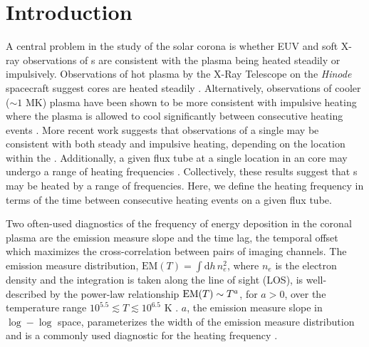 \section{Introduction}\label{sec:introduction}

A central problem in the study of the solar corona is whether EUV and soft X-ray observations of \AR s are consistent with the plasma being heated steadily or impulsively.
Observations of hot plasma by the X-Ray Telescope \citep[XRT,][]{golub_x-ray_2007} on the \textit{Hinode} spacecraft \citep{kosugi_hinode_2007} suggest \AR{} cores are heated steadily \citep[e.g.][]{warren_constraints_2011,winebarger_using_2011}.
Alternatively, observations of cooler ($\sim1$ MK) plasma have been shown to be more consistent with impulsive heating where the plasma is allowed to cool significantly between consecutive heating events \citep[e.g][]{winebarger_evolving_2003,mulu-moore_determining_2011,ugarte-urra_investigation_2006,viall_patterns_2011,viall_evidence_2012}.
More recent work \citep{del_zanna_evolution_2015,bradshaw_patterns_2016} suggests that observations of a single \AR{} may be consistent with both steady and impulsive heating, depending on the location within the \AR{}.
Additionally, a given flux tube at a single location in an \AR{} core may undergo a range of heating frequencies \citep[e.g.][]{cargill_active_2014}.
Collectively, these results suggest that \AR s may be heated by a range of frequencies.
Here, we define the heating frequency in terms of the time between consecutive heating events on a given flux tube.

Two often-used diagnostics of the frequency of energy deposition in the coronal plasma are the  emission measure slope and the time lag, the temporal offset which maximizes the cross-correlation between pairs of imaging channels.
The emission measure distribution, $\mathrm{EM}(T)=\int\mathrm{d}h\,n_e^2$, where $n_e$ is the electron density and the integration is taken along the line of sight (LOS), is well-described by the power-law relationship $\textup{EM}(T)\sim T^a$, for $a>0$, over the temperature range $10^{5.5}\lesssim T\lesssim10^{6.5}$ K \citep{jordan_structure_1975,jordan_structure_1976}.
$a$, the emission measure slope in $\log-\log$ space, parameterizes the width of the emission measure distribution and is a commonly used diagnostic for the heating frequency \citep[e.g.][]{tripathi_emission_2011,winebarger_using_2011,warren_constraints_2011,mulu-moore_can_2011,bradshaw_diagnosing_2012,schmelz_cold_2012,reep_diagnosing_2013,del_zanna_evolution_2015}.

